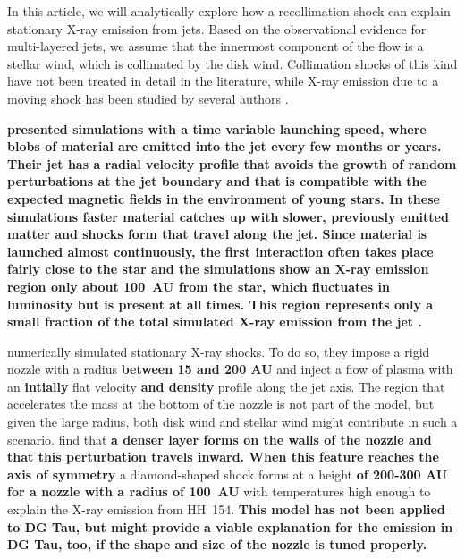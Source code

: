 \documentclass[manuscript]{aastex}
\begin{document}
In this article, we will analytically explore how a recollimation shock can explain stationary X-ray emission from jets. Based on the observational evidence for multi-layered jets, we assume that the innermost component of the flow is a stellar wind, which is collimated by the disk wind. Collimation shocks of this kind have not been treated in detail in the literature, while X-ray emission due to a moving shock has been studied by several authors \citep[see, e.g.\ the analytical work and numerical simulations by][]{2002ApJ...576L.149R,2007A&A...462..645B}.

\textbf{\citet{2010A&A...511A..42B} presented simulations with a time variable launching speed, where blobs of material are emitted into the jet every few months or years. Their jet has a radial velocity profile that avoids the growth of random perturbations at the jet boundary and that is compatible with the expected magnetic fields in the environment of young stars. In these simulations faster material catches up with slower, previously emitted matter and shocks form that travel along the jet. Since material is launched almost continuously, the first interaction often takes place fairly close to the star and the simulations show an X-ray emission region only about 100~AU from the star, which fluctuates in luminosity but is present at all times. This region represents only a small fraction of the total simulated X-ray emission from the jet \citep{2010A&A...517A..68B}. }

\citet{2011ApJ...737...54B} numerically simulated stationary X-ray shocks. To do so, they impose a rigid nozzle with a radius \textbf{between 15 and 200 AU} and inject a flow of plasma with an \textbf{intially} flat velocity \textbf{and density} profile along the jet axis. The region that accelerates the mass at the bottom of the nozzle is not part of the model, but given the large radius, both disk wind and stellar wind might contribute in such a scenario. \citet{2011ApJ...737...54B} find that \textbf{a denser layer forms on the walls of the nozzle and that this perturbation travels inward. When this feature reaches the axis of symmetry} a diamond-shaped shock forms at a height \textbf{of 200-300 AU for a nozzle with a radius of 100~AU} with temperatures high enough to explain the X-ray emission from HH~154. \textbf{This model has not been applied to DG Tau, but might provide a viable explanation for the emission in DG Tau, too, if the shape and size of the nozzle is tuned properly.} 
\end{document}
